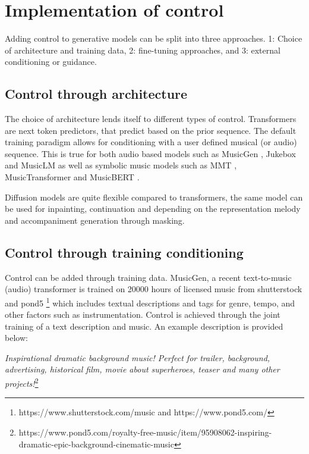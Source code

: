 \section{Implementation of control} \label{section:addingcontrol}
Adding control to generative models can be split into three approaches. 1: Choice of architecture and training data, 2: fine-tuning approaches, and 3: external conditioning or guidance.

\subsection{Control through architecture}
The choice of architecture lends itself to different types of control. Transformers are next token predictors, that predict based on the prior sequence. The default training paradigm allows for conditioning with a user defined musical (or audio) sequence. This is true for both audio based models such as MusicGen \cite{copet2023simple}, Jukebox \cite{Dhariwal_Jun_Payne_Kim_Radford_Sutskever_2020} and MusicLM \cite{Agostinelli_Denk_Borsos_Engel_Verzetti_Caillon_Huang_Jansen_Roberts_Tagliasacchi_et_al._2023} as well as symbolic music models such as MMT \cite{Dong_Chen_MMT_Kirkpatrick_2023}, MusicTransformer \cite{Huang_Vaswani_Uszkoreit_Shazeer_Simon_Hawthorne_Dai_Hoffman_Dinculescu_Eck_2018} and MusicBERT \cite{Zeng_Tan_Wang_MUSICBERT_2021}. 

Diffusion models are quite flexible compared to transformers, the same model can be used for inpainting, continuation and depending on the representation melody and accompaniment generation through masking.\cite{Min_Jiang_Xia_Zhao_polyffusion_2023}\cite{Rombach_Blattmann_Lorenz_Esser_Ommer_2022}

\subsection{Control through training conditioning}
Control can be added through training data. MusicGen\cite{copet2023simple}, a recent text-to-music (audio) transformer is trained on 20000 hours of licensed music from shutterstock and pond5 \footnote{https://www.shutterstock.com/music and https://www.pond5.com/} which includes textual descriptions and tags for genre, tempo, and other factors such as instrumentation. Control is achieved through the joint training of a text description and music. An example description is provided below: 

\textit{Inspirational dramatic background music! Perfect for trailer, background, advertising, historical film, movie about superheroes, teaser and many other projects!}\footnote{ https://www.pond5.com/royalty-free-music/item/95908062-inspiring-dramatic-epic-background-cinematic-music
}


